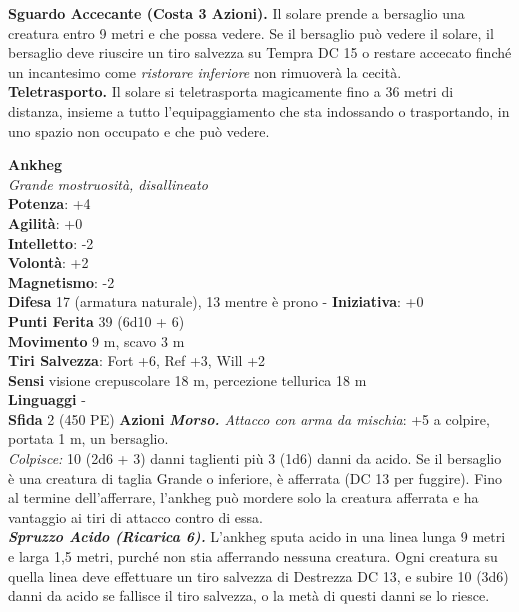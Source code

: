 \begin{multicols}{2}
\textbf{Sguardo Accecante (Costa 3 Azioni).} Il solare prende a bersaglio una creatura entro 9 metri e che possa vedere. Se il bersaglio può vedere il solare, il bersaglio deve riuscire un tiro salvezza su Tempra DC 15 o restare accecato finché un incantesimo come \emph{ristorare inferiore} non rimuoverà la cecità.\\
\textbf{Teletrasporto.} Il solare si teletrasporta magicamente fino a 36 metri di distanza, insieme a tutto l'equipaggiamento che sta indossando o trasportando, in uno spazio non occupato e che può vedere.

\medskip\textbf{Ankheg}\\
\emph{Grande mostruosità, disallineato}\\
\textbf{Potenza}: +4\\
\textbf{Agilità}: +0\\
\textbf{Intelletto}: -2\\
\textbf{Volontà}: +2\\
\textbf{Magnetismo}: -2\\
\textbf{Difesa} 17 (armatura naturale), 13 mentre è prono - \textbf{Iniziativa}: +0\\
\textbf{Punti Ferita} 39 (6d10 + 6)\\
\textbf{Movimento} 9 m, scavo 3 m\\
\textbf{Tiri Salvezza}: Fort +6, Ref +3, Will +2\\
\textbf{Sensi} visione crepuscolare 18 m, percezione tellurica 18 m\\
\textbf{Linguaggi} -\\
\textbf{Sfida} 2 (450 PE)\smallskip
\smallskip\textbf{Azioni}
\emph{\textbf{Morso.} Attacco con arma da mischia}: +5 a colpire, portata 1 m, un bersaglio.\\
\emph{Colpisce:} 10 (2d6 + 3) danni taglienti più 3 (1d6) danni da acido. Se il bersaglio è una creatura di taglia Grande o inferiore, è afferrata (DC 13 per fuggire). Fino al termine dell'afferrare, l'ankheg può mordere solo la creatura afferrata e ha vantaggio ai tiri di attacco contro di essa.\\
\emph{\textbf{Spruzzo Acido (Ricarica 6).}} L'ankheg sputa acido in una linea lunga 9 metri e larga 1,5 metri, purché non stia afferrando nessuna creatura. Ogni creatura su quella linea deve effettuare un tiro salvezza di Destrezza DC 13, e subire 10 (3d6) danni da acido se fallisce il tiro salvezza, o la metà di questi danni se lo riesce.\\


\end{multicols}
